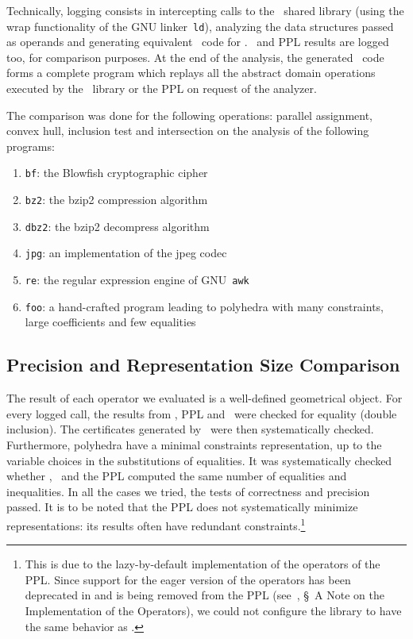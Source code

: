 Technically, logging consists in intercepting calls to the \apron\ shared
library (using the wrap functionality of the GNU linker~\texttt{ld}),
analyzing the data structures passed as operands and
generating equivalent \ocaml\ code for \libpoly .
\newpolka\ and PPL results are logged too, for comparison purposes.
At the end of the analysis, the generated \ocaml\ code forms a complete program
which replays all the abstract domain operations executed by the \newpolka\ library or the PPL
on request of the analyzer.

The comparison was done for the following operations: parallel assignment,
convex hull, inclusion test and intersection on the analysis of the following programs:
\begin{enumerate}
\item \texttt{bf}: the Blowfish cryptographic cipher
\item \texttt{bz2}: the bzip2 compression algorithm
\item \texttt{dbz2}: the bzip2 decompress algorithm
\item \texttt{jpg}: an implementation of the jpeg codec
\item \texttt{re}: the regular expression engine of GNU~\texttt{awk}
\item \texttt{foo}: a hand-crafted program leading to polyhedra with many constraints,
	large coefficients and few equalities
\end{enumerate}
\subsection{Precision and Representation Size Comparison}
The result of each operator we evaluated is a well-defined geometrical object.
For every logged call,
the results from \newpolka, PPL and \libpoly\ were checked for equality (double inclusion).
The certificates generated by \libpoly\ were then systematically checked.
Furthermore, polyhedra have a minimal constraints re\-presentation,
up to the variable choices in the substitutions of equalities.
It was systematically checked
whether \libpoly, \newpolka\ and the PPL computed the same number of equalities and inequalities.
In all the cases we tried, the tests of correctness and precision passed.
It is to be noted that the PPL does not systematically minimize representations:
its results often have redundant constraints.\footnote{This is due to the lazy-by-default implementation of the operators of the PPL.
Since support for the eager version of the operators has been deprecated in and is being removed from the PPL
(see~\cite{ppldoc}, \S\ A Note on the Implementation of the Operators),
we could not configure the library to have the same behavior as \newpolka .}

